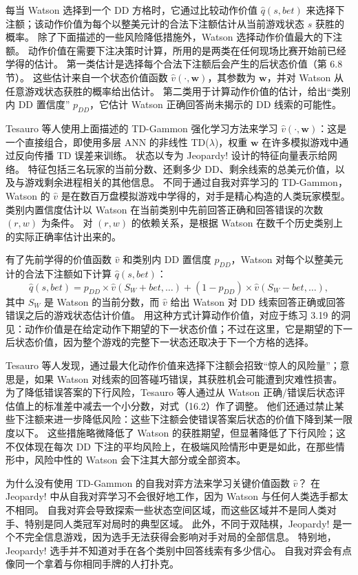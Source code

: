 \documentclass[UTF8, 12pt, fontset=fandol, oneside]{ctexart}
\begin{document}
每当 Watson 选择到一个 DD 方格时，它通过比较动作价值 $\hat q(s,bet)$ 来选择下注额；该动作价值为每个以整美元计的合法下注额估计从当前游戏状态 $s$ 获胜的概率。
除了下面描述的一些风险降低措施外，Watson 选择动作价值最大的下注额。
动作价值在需要下注决策时计算，所用的是两类在任何现场比赛开始前已经学得的估计。
第一类估计是选择每个合法下注额后会产生的后状态价值（第 6.8 节）。
这些估计来自一个状态价值函数 $\hat v(\cdot,\mathbf{w})$，其参数为 $\mathbf{w}$，并对 Watson 从任意游戏状态获胜的概率给出估计。
第二类用于计算动作价值的估计，给出“类别内 DD 置信度” $p_{DD}$，它估计 Watson 正确回答尚未揭示的 DD 线索的可能性。

Tesauro 等人使用上面描述的 TD-Gammon 强化学习方法来学习 $\hat v(\cdot,\mathbf{w})$：这是一个直接组合，即使用多层 ANN 的非线性 TD($\lambda$)，权重 $\mathbf{w}$ 在许多模拟游戏中通过反向传播 TD 误差来训练。
状态以专为 Jeopardy! 设计的特征向量表示给网络。
特征包括三名玩家的当前分数、还剩多少 DD、剩余线索的总美元价值，以及与游戏剩余进程相关的其他信息。
不同于通过自我对弈学习的 TD-Gammon，Watson 的 $\hat v$ 是在数百万盘模拟游戏中学得的，对手是精心构造的人类玩家模型。
类别内置信度估计以 Watson 在当前类别中先前回答正确和回答错误的次数 $(r,w)$ 为条件。
对 $(r,w)$ 的依赖关系，是根据 Watson 在数千个历史类别上的实际正确率估计出来的。

有了先前学得的价值函数 $\hat v$ 和类别内 DD 置信度 $p_{DD}$，Watson 对每个以整美元计的合法下注额如下计算 $\hat q(s,bet)$：
\begin{equation}
\hat q(s,bet)=p_{DD}\times \hat v(S_W+bet,\ldots)
+(1-p_{DD})\times \hat v(S_W-bet,\ldots),
\tag{16.2}
\end{equation}
其中 $S_W$ 是 Watson 的当前分数，而 $\hat v$ 给出 Watson 对 DD 线索回答正确或回答错误之后的游戏状态估计价值。
用这种方式计算动作价值，对应于练习 3.19 的洞见：动作价值是在给定动作下期望的下一状态价值；不过在这里，它是期望的下一后状态价值，因为整个游戏的完整下一状态还取决于下一个方格的选择。

Tesauro 等人发现，通过最大化动作价值来选择下注额会招致“惊人的风险量”；意思是，如果 Watson 对线索的回答碰巧错误，其获胜机会可能遭到灾难性损害。
为了降低错误答案的下行风险，Tesauro 等人通过从 Watson 正确/错误后状态评估值上的标准差中减去一个小分数，对式（16.2）作了调整。
他们还通过禁止某些下注额来进一步降低风险：这些下注额会使错误答案后状态的价值下降到某一限度以下。
这些措施略微降低了 Watson 的获胜期望，但显著降低了下行风险；这不仅体现在每次 DD 下注的平均风险上，在极端风险情形中更是如此，在那些情形中，风险中性的 Watson 会下注其大部分或全部资本。

为什么没有使用 TD-Gammon 的自我对弈方法来学习关键价值函数 $\hat v$？
在 Jeopardy! 中从自我对弈学习不会很好地工作，因为 Watson 与任何人类选手都太不相同。
自我对弈会导致探索一些状态空间区域，而这些区域并不是同人类对手、特别是同人类冠军对局时的典型区域。
此外，不同于双陆棋，Jeopardy! 是一个不完全信息游戏，因为选手无法获得会影响对手对局的全部信息。
特别地，Jeopardy! 选手并不知道对手在各个类别中回答线索有多少信心。
自我对弈会有点像同一个拿着与你相同手牌的人打扑克。
\end{document}
